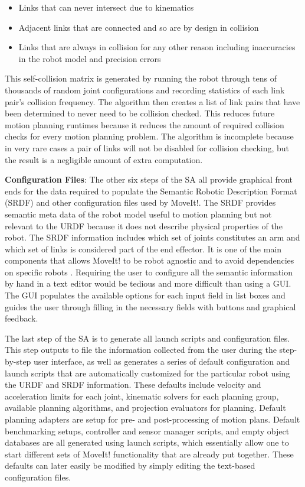 \documentclass[10pt,journal,compsoc]{joser1}
\begin{document}
{\begin{itemize}
    \item Links that can never intersect due to kinematics
    \item Adjacent links that are connected and so are by design in collision
    \item Links that are always in collision for any other reason including inaccuracies in the robot model and precision errors
\end{itemize}

This self-collision matrix is generated by running the robot through tens of thousands of random joint configurations and recording statistics of each link pair's collision frequency. The algorithm then creates a list of link pairs that have been determined to never need to be collision checked. This reduces future motion planning runtimes because it reduces the amount of required collision checks for every motion planning problem. The algorithm is incomplete because in very rare cases a pair of links will not be disabled for collision checking, but the result is a negligible amount of extra computation.

{\bf Configuration Files}: The other six steps of the SA all provide graphical front ends for the data required to populate the Semantic Robotic Description Format (SRDF) and other configuration files used by MoveIt!. The SRDF provides semantic meta data of the robot model useful to motion planning but not relevant to the URDF because it does not describe physical properties of the robot. The SRDF information includes which set of joints constitutes an arm and which set of links is considered part of the end effector. It is one of the main components that allows MoveIt! to be robot agnostic and to avoid dependencies on specific robots \cite{moveit}. Requiring the user to configure all the semantic information by hand in a text editor would be tedious and more difficult than using a GUI. The GUI populates the available options for each input field in list boxes and guides the user through filling in the necessary fields with buttons and graphical feedback.

The last step of the SA is to generate all launch scripts and configuration files. This step outputs to file the information collected from the user during the step-by-step user interface, as well as generates a series of default configuration and launch scripts that are automatically customized for the particular robot using the URDF and SRDF information. These defaults include velocity and acceleration limits for each joint, kinematic solvers for each planning group, available planning algorithms, and projection evaluators for planning. Default planning adapters are setup for pre- and post-processing of motion plans. Default benchmarking setups, controller and sensor manager scripts, and empty object databases are all generated using launch scripts, which essentially allow one to start different sets of MoveIt! functionality that are already put together. These defaults can later 
easily be modified by simply editing the text-based configuration files.

}
\end{document}
